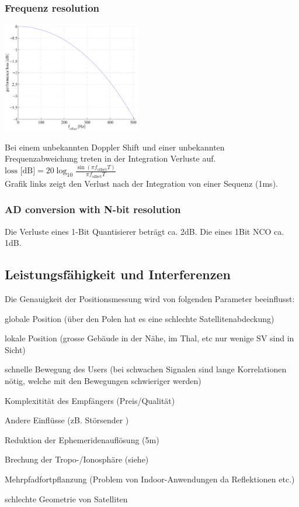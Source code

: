 \subsubsection{Frequenz resolution}
	\begin{minipage}{8cm}
    	\includegraphics[width=6cm]{./bilder/GPS-FrequenzResolution.png}
    \end{minipage}
	\begin{minipage}{10cm}
	    Bei einem unbekannten Doppler Shift und einer unbekannten Frequenzabweichung
		treten in der Integration Verluste auf.\\
		$\text{loss [dB]}= 20 \log_{10} \frac{\sin(\pi f_{\mathrm{offset}}T)} {\pi
		f_{\mathrm{offset}}T}$\\
     	Grafik links zeigt den Verlust nach der Integration von einer Sequenz
     	(1ms).
    \end{minipage}
\subsubsection{AD conversion with N-bit resolution }
	Die Verluste eines 1-Bit Quantisierer beträgt ca. 2dB. Die eines 1Bit NCO ca.
	1dB.

\subsection{Leistungsfähigkeit und Interferenzen}
	Die Genauigkeit der Positionsmessung wird von folgenden Parameter beeinflusst:
	\begin{liste}
    	\item globale Position (über den Polen hat es eine schlechte
    	Satellitenabdeckung)
    	\item lokale Position (grosse Gebäude in der Nähe, im Thal, etc nur wenige
    	SV sind in Sicht)
    	\item schnelle Bewegung des Users (bei schwachen Signalen sind lange
    	Korrelationen nötig, welche mit den Bewegungen schwieriger werden)
    	\item Komplexitität des Empfängers (Preis/Qualität)
    	\item Andere Einflüsse (zB. Störsender )
    	\item Reduktion der Ephemeridenauflösung (5m)
    	\item Brechung der Tropo-/Ionosphäre (siehe)
    	\item Mehrpfadfortpflanzung (Problem von Indoor-Anwendungen da Reflektionen
    	etc.)
    	\item schlechte Geometrie von Satelliten
    \end{liste}

